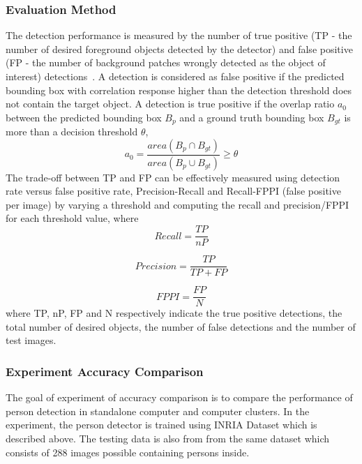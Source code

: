 \subsubsection{Evaluation Method}
\label{subsec:evaluation_method}
The detection performance is measured by the number of true positive (TP - the
number of desired foreground objects detected by the detector) and false
positive  (FP - the number of background patches wrongly detected as the object
of  interest) detections~\cite{2013_ICCV_Hamed}. A detection is considered as
false positive if the predicted  bounding box with correlation response higher than the detection
threshold does not contain the target object. A detection is true positive if 
the overlap ratio $a_0$ between the predicted bounding box $B_p$ and a ground
truth bounding box $B_{gt}$ is more than a decision threshold $\theta$,
\begin{equation}
	a_0 = \frac{area(B_p \cap B_{gt})}{area(B_p \cup B_{gt})} \geq \theta
\end{equation}
The trade-off between TP and FP can be effectively measured using detection
rate versus false positive rate, Precision-Recall and Recall-FPPI  (false
positive per image) by varying a threshold and computing the recall and
precision/FPPI  for each threshold value, where
\begin{equation}
	Recall = \frac{TP}{nP}
\end{equation}

\begin{equation}
	Precision = \frac{TP}{TP + FP}
\end{equation}

\begin{equation}
	FPPI = \frac{FP}{N}
\end{equation}
where TP, nP, FP and N respectively indicate the true positive detections, the
total number of desired objects, the number of false detections and the number of test images.


\subsubsection{Experiment Accuracy Comparison}
The goal of experiment of accuracy comparison is to compare the performance of
person detection in standalone computer and computer clusters. In the
experiment, the person detector is trained using INRIA Dataset which is
described above. The testing data is also from from the same dataset which
consists of 288 images possible containing persons inside. 

